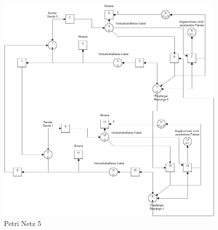 \documentclass[10pt]{scrartcl}
\begin{document}
	\begin{figure}[H]
                \includegraphics[width=\textwidth]{praktikum1-aufgabe5.png}
        \caption{Petri Netz 5}
        \label{img:aufg5}
	\end{figure}
\end{document}
